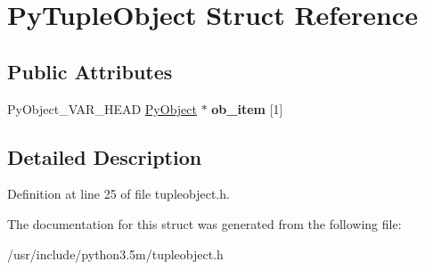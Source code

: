 \hypertarget{structPyTupleObject}{}\section{Py\+Tuple\+Object Struct Reference}
\label{structPyTupleObject}
\subsection*{Public Attributes}
\begin{DoxyCompactItemize}
\item 
Py\+Object\+\_\+\+V\+A\+R\+\_\+\+H\+E\+AD \hyperlink{struct__object}{Py\+Object} $\ast$ {\bfseries ob\+\_\+item} \mbox{[}1\mbox{]}\hypertarget{structPyTupleObject_ab28040a8b2ac21163a7df75596c1c431}{}\label{structPyTupleObject_ab28040a8b2ac21163a7df75596c1c431}

\end{DoxyCompactItemize}


\subsection{Detailed Description}


Definition at line 25 of file tupleobject.\+h.



The documentation for this struct was generated from the following file\+:\begin{DoxyCompactItemize}
\item 
/usr/include/python3.\+5m/tupleobject.\+h\end{DoxyCompactItemize}
